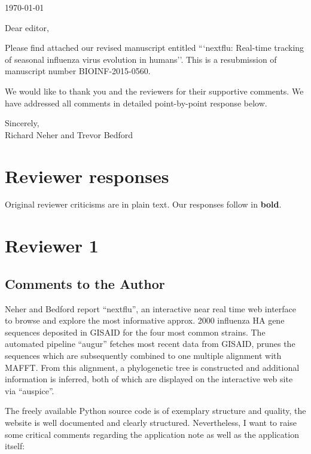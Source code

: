 \documentclass[11pt,oneside,letterpaper]{article}
\begin{document}

\today

\vspace{1cm}

Dear editor,

Please find attached our revised manuscript entitled ```nextflu: Real-time tracking of seasonal influenza virus evolution in humans''.  This is a resubmission of manuscript number BIOINF-2015-0560.

We would like to thank you and the reviewers for their supportive comments. We have addressed all comments in detailed point-by-point response below.

Sincerely,\\
Richard Neher and Trevor Bedford

\restoregeometry

\newpage

\section*{Reviewer responses}

Original reviewer criticisms are in plain text.  Our responses follow in \textbf{bold}.  


\section*{Reviewer 1}

\subsection*{Comments to the Author}

Neher and Bedford report ``nextflu'', an interactive near real time web interface to browse and explore the most informative approx. 2000 influenza HA gene sequences deposited in GISAID for the four most common strains. The automated pipeline ``augur'' fetches most recent data from GISAID, prunes the sequences which are subsequently combined to one multiple alignment with MAFFT. From this alignment, a phylogenetic tree is constructed and additional information is inferred, both of which are displayed on the interactive web site via ``auspice''.

The freely available Python source code is of exemplary structure and quality, the website is well documented and clearly structured. Nevertheless, I want to raise some critical comments regarding the application note as well as the application itself:
\end{document}
